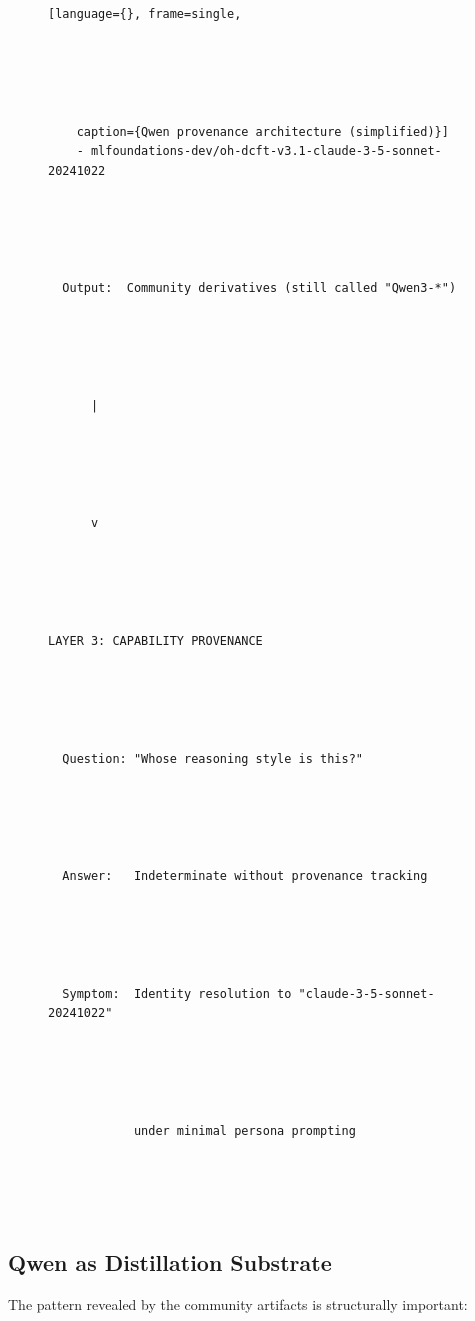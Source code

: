 \begin{figure}[h]
\begin{lstlisting}[language={}, frame=single,





    caption={Qwen provenance architecture (simplified)}]
    - mlfoundations-dev/oh-dcft-v3.1-claude-3-5-sonnet-20241022





  Output:  Community derivatives (still called "Qwen3-*")





      |





      v





LAYER 3: CAPABILITY PROVENANCE





  Question: "Whose reasoning style is this?"





  Answer:   Indeterminate without provenance tracking





  Symptom:  Identity resolution to "claude-3-5-sonnet-20241022"





            under minimal persona prompting





\end{lstlisting}





\end{figure}











\subsection{Qwen as Distillation Substrate}











The pattern revealed by the community artifacts is structurally important:











